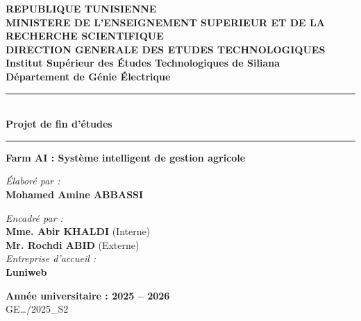 \documentclass[12pt,a4paper]{report}
\begin{document}
\thispagestyle{empty}

\begin{titlepage}
  \begin{center}

    {\large \textbf{REPUBLIQUE TUNISIENNE}} \\[2pt]
    {\normalsize \textbf{MINISTERE DE L'ENSEIGNEMENT SUPERIEUR ET DE LA RECHERCHE SCIENTIFIQUE}} \\[2pt]
    {\normalsize \textbf{DIRECTION GENERALE DES ETUDES TECHNOLOGIQUES}} \\[0.8cm]


    {\Large \textbf{Institut Supérieur des Études Technologiques de Siliana}} \\[4pt]
    {\large \textbf{Département de Génie Électrique}}

    \vspace{1.5cm}
    \rule{\linewidth}{0.8pt}\\[0.4cm]
    {\Large \textbf{Projet de fin d'études}}\\[0.4cm]
    \rule{\linewidth}{0.8pt}

    \vspace{1cm}

    {\LARGE \textbf{Farm AI : Système intelligent de gestion agricole}}

    \vspace{2cm}

    \begin{minipage}{0.45\textwidth}
      \begin{flushleft}
        \emph{Élaboré par :}\\[4pt]
        \textbf{Mohamed Amine ABBASSI}
      \end{flushleft}
    \end{minipage}
    \hfill
    \begin{minipage}{0.45\textwidth}
      \begin{flushright}
        \emph{Encadré par :}\\[4pt]
        \textbf{Mme. Abir KHALDI} (Interne)\\
        \textbf{Mr. Rochdi ABID} (Externe)\\[8pt]
        \emph{Entreprise d'accueil :}\\[4pt]
        \textbf{Luniweb}
      \end{flushright}
    \end{minipage}

    \vfill

    {\large \textbf{Année universitaire : 2025 -- 2026}}\\[4pt]
    {\normalsize GE…/2025\_S2}

  \end{center}
\end{titlepage}
\end{document}

